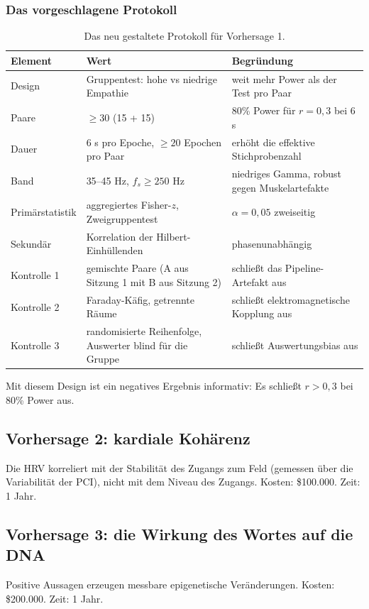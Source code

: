 \documentclass[11pt,a4paper]{article}
\begin{document}
\subsubsection*{Das vorgeschlagene Protokoll}
\begin{table}[H]
\centering
\small
\begin{tabular}{@{}p{3.2cm}p{4.6cm}p{6.2cm}@{}}
\toprule
\textbf{Element} & \textbf{Wert} & \textbf{Begründung} \\ \midrule
Design & Gruppentest: hohe vs niedrige Empathie & weit mehr Power als der Test pro Paar \\
Paare & $\geq 30$ (15 + 15) & 80\% Power für $r = 0,3$ bei 6 s \\
Dauer & 6 s pro Epoche, $\geq 20$ Epochen pro Paar & erhöht die effektive Stichprobenzahl \\
Band & 35--45 Hz, $f_s \geq 250$ Hz & niedriges Gamma, robust gegen Muskelartefakte \\
Primärstatistik & aggregiertes Fisher-$z$, Zweigruppentest & $\alpha = 0,05$ zweiseitig \\
Sekundär & Korrelation der Hilbert-Einhüllenden & phasenunabhängig \\
Kontrolle 1 & gemischte Paare (A aus Sitzung 1 mit B aus Sitzung 2) & schließt das Pipeline-Artefakt aus \\
Kontrolle 2 & Faraday-Käfig, getrennte Räume & schließt elektromagnetische Kopplung aus \\
Kontrolle 3 & randomisierte Reihenfolge, Auswerter blind für die Gruppe & schließt Auswertungsbias aus \\ \bottomrule
\end{tabular}
\caption{Das neu gestaltete Protokoll für Vorhersage 1.}
\label{tab:protocol}
\end{table}

Mit diesem Design ist ein negatives Ergebnis informativ: Es schließt $r > 0,3$ bei 80\% Power aus.

\subsection{Vorhersage 2: kardiale Kohärenz}
Die HRV korreliert mit der Stabilität des Zugangs zum Feld (gemessen über die Variabilität der PCI), nicht mit dem Niveau des Zugangs. Kosten: \$100.000. Zeit: 1 Jahr.

\subsection{Vorhersage 3: die Wirkung des Wortes auf die DNA}
Positive Aussagen erzeugen messbare epigenetische Veränderungen. Kosten: \$200.000. Zeit: 1 Jahr.
\end{document}
